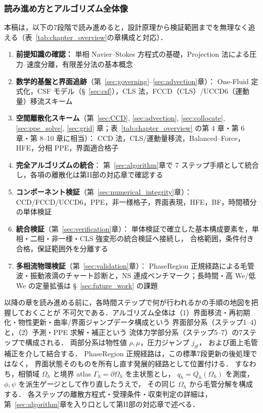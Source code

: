 \subsubsection{読み進め方とアルゴリズム全体像}
\label{sec:algo_overview}

本稿は，以下の7段階で読み進めると，設計原理から検証範囲までを無理なく追える（表~\ref{tab:chapter_overview}の章構成と対応）．
\begin{enumerate}
  \item \textbf{前提知識の確認：}
        単相 Navier--Stokes 方程式の基礎，Projection 法による圧力--速度分離，有限差分法の基本概念
  \item \textbf{数学的基盤と界面追跡}（第~\ref{sec:governing}--\ref{sec:advection}章）：
        One-Fluid 定式化，CSF モデル（§~\ref{sec:csf}），CLS 法，FCCD（CLS）/UCCD6（運動量）移流スキーム
  \item \textbf{空間離散化スキーム}（第~\ref{sec:CCD}, \ref{sec:advection}, \ref{sec:collocate}, \ref{sec:ppe_solve}, \ref{sec:grid} 章；表~\ref{tab:chapter_overview} の第 4 章・第 6 章・第 8--10 章に相当）：
        CCD 法，CLS/運動量移流，Balanced--Force，HFE，分相 PPE，界面適合格子
  \item \textbf{完全アルゴリズムの統合}：
        第~\ref{sec:algorithm}章で 7 ステップ手順として統合し，各項の離散化は第II部の対応章で確認する
  \item \textbf{コンポーネント検証}（第~\ref{sec:numerical_integrity}章）：
        CCD/FCCD/UCCD6，PPE，非一様格子，界面表現，HFE，BF，時間積分の単体検証
  \item \textbf{統合検証}（第~\ref{sec:verification}章）：
        単体検証で確立した基本構成要素を，単相・二相・非一様・CLS 強変形の統合検証へ接続し，
        合格範囲，条件付き合格，保証範囲外を分離する
  \item \textbf{多相流物理検証}（第~\ref{sec:validation}章）：
        PhaseRegion 正規経路による毛管波・振動液滴のチャート診断と，NS 連成ベンチマーク；長時間・高 We/低 We の定量拡張は §~\ref{sec:future_work} の課題
\end{enumerate}

以降の章を読み進める前に，各時間ステップで何が行われるかの手順の地図を把握しておくことが
不可欠である．アルゴリズム全体は（1）界面移流・再初期化・物性更新・曲率/界面ジャンプデータ構成という
界面部分系（ステップ1--4）と，（2）予測・PPE 求解・補正という
流体力学部分系（ステップ5--7）の7ステップで構成される．
両部分系は物性値 $\rho,\mu$，圧力ジャンプ $j_{gl}$，
および面上毛管補正を介して結合する．
PhaseRegion 正規経路は，この標準7段更新の後処理ではなく，
界面状態そのものを所有し直す発展的経路として位置付ける．
すなわち，相領域 $\Omega_h$ と境界 atlas $\Gamma_h=\partial\Omega_h$ を主状態とし，
$q_h=Q_h(\Omega_h)$ を測度，$\phi,\psi$ を派生ゲージとして作り直したうえで，
その同じ $\Omega_h$ から毛管分解を構成する．
各ステップの離散方程式・受理条件・収束判定の詳細は，
第~\ref{sec:algorithm}章を入り口として第II部の対応章で述べる．

